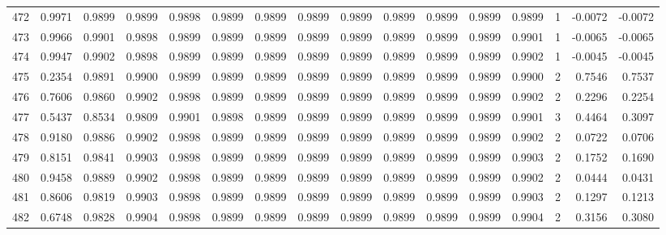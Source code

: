 \begin{tabular}{lrrrrrrrrrrrrrrr}
472 &      0.9971 &  0.9899 &  0.9899 &  0.9898 &  0.9899 &  0.9899 &  0.9899 &  0.9899 &  0.9899 &  0.9899 &   0.9899 &     0.9899 &      1 &                   -0.0072 &                    -0.0072 \\
473 &      0.9966 &  0.9901 &  0.9898 &  0.9899 &  0.9899 &  0.9899 &  0.9899 &  0.9899 &  0.9899 &  0.9899 &   0.9899 &     0.9901 &      1 &                   -0.0065 &                    -0.0065 \\
474 &      0.9947 &  0.9902 &  0.9898 &  0.9899 &  0.9899 &  0.9899 &  0.9899 &  0.9899 &  0.9899 &  0.9899 &   0.9899 &     0.9902 &      1 &                   -0.0045 &                    -0.0045 \\
475 &      0.2354 &  0.9891 &  0.9900 &  0.9899 &  0.9899 &  0.9899 &  0.9899 &  0.9899 &  0.9899 &  0.9899 &   0.9899 &     0.9900 &      2 &                    0.7546 &                     0.7537 \\
476 &      0.7606 &  0.9860 &  0.9902 &  0.9898 &  0.9899 &  0.9899 &  0.9899 &  0.9899 &  0.9899 &  0.9899 &   0.9899 &     0.9902 &      2 &                    0.2296 &                     0.2254 \\
477 &      0.5437 &  0.8534 &  0.9809 &  0.9901 &  0.9898 &  0.9899 &  0.9899 &  0.9899 &  0.9899 &  0.9899 &   0.9899 &     0.9901 &      3 &                    0.4464 &                     0.3097 \\
478 &      0.9180 &  0.9886 &  0.9902 &  0.9898 &  0.9899 &  0.9899 &  0.9899 &  0.9899 &  0.9899 &  0.9899 &   0.9899 &     0.9902 &      2 &                    0.0722 &                     0.0706 \\
479 &      0.8151 &  0.9841 &  0.9903 &  0.9898 &  0.9899 &  0.9899 &  0.9899 &  0.9899 &  0.9899 &  0.9899 &   0.9899 &     0.9903 &      2 &                    0.1752 &                     0.1690 \\
480 &      0.9458 &  0.9889 &  0.9902 &  0.9898 &  0.9899 &  0.9899 &  0.9899 &  0.9899 &  0.9899 &  0.9899 &   0.9899 &     0.9902 &      2 &                    0.0444 &                     0.0431 \\
481 &      0.8606 &  0.9819 &  0.9903 &  0.9898 &  0.9899 &  0.9899 &  0.9899 &  0.9899 &  0.9899 &  0.9899 &   0.9899 &     0.9903 &      2 &                    0.1297 &                     0.1213 \\
482 &      0.6748 &  0.9828 &  0.9904 &  0.9898 &  0.9899 &  0.9899 &  0.9899 &  0.9899 &  0.9899 &  0.9899 &   0.9899 &     0.9904 &      2 &                    0.3156 &                     0.3080 \\

\end{tabular}
